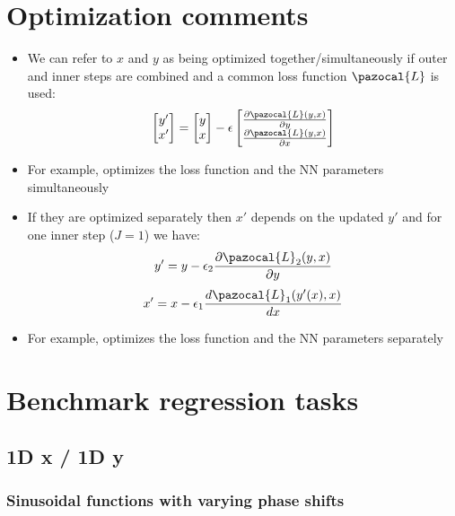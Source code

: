 \section{Optimization comments}
\begin{itemize}
	\item We can refer to $x$ and $y$ as being optimized together/simultaneously if outer and inner steps are combined and a common loss function $\pazocal{L}$ is used:
	\begin{equation}
		\begin{bmatrix}
			y'\\x'
		\end{bmatrix} = 
		\begin{bmatrix}
			y\\x
		\end{bmatrix}
		- \epsilon
		\begin{bmatrix}
			\frac{\partial \pazocal{L}(y, x)}{\partial y}\\\frac{\partial \pazocal{L}(y, x)}{\partial x}
		\end{bmatrix}
	\end{equation}
	\item For example, \textcite{barron2019general} optimizes the loss function and the NN parameters simultaneously
	\item If they are optimized separately then $x'$ depends on the updated $y'$ and for one inner step ($J=1$) we have:
	\begin{equation}
		y' = y - \epsilon_2\frac{\partial \pazocal{L}_2(y, x)}{\partial y}
	\end{equation}
	\begin{equation}
		x' = x - \epsilon_1\frac{d \pazocal{L}_1(y'(x), x)}{d x}
	\end{equation}
	\item For example, \textcite{bechtle2020metalearning} optimizes the loss function and the NN parameters separately
\end{itemize}

\section{Benchmark regression tasks}\label{}
\subsection{1D x / 1D y}
\subsubsection{Sinusoidal functions with varying phase shifts}

